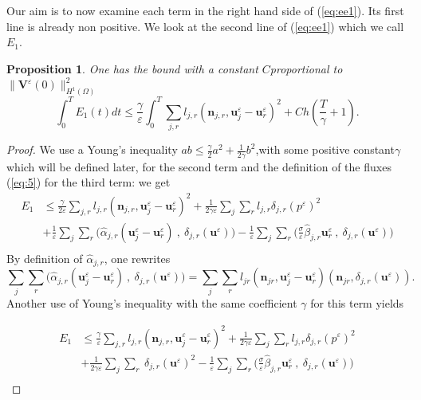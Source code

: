 \documentclass[a4paper,french,english,10pt]{article}
\newcommand\ljr{l_{jr}}
\newcommand\njr{\mathbf{n}_{jr}}
\newcommand\uu{\mathbf{u}}
\newcommand\eps{\varepsilon}
\newtheorem{pro}[theorem]{Proposition}
\begin{document}
Our aim is to now examine each term in the right hand side of
(\ref{eq:ee1}). Its  first line is already non positive.
We  look at the second line of (\ref{eq:ee1})  which we call
$E_1$. 
\begin{pro}
One has
the bound with a constant $C$proportional to $  \|  \mathbf V ^\eps (0) \|^2_  { H^1(\Omega)  }$  
\begin{equation} \label{eq:bound1}
\int_0^T E_1(t)dt \leq 
\frac{\gamma}{\eps}\int_0^T\sum_{j,r}l_{j,r}(\textbf{n}_{j,r},\textbf{u}_j^{\eps}-\textbf{u}
_r^{\eps})^2 
+Ch(  \frac T {\gamma } +1).
\end{equation}
\end{pro}
\begin{proof}
We use a Young's inequality 
$ab\leq \frac\gamma2 a^2+\frac1{2\gamma} b^2$,with some positive constant$\gamma$ which will be defined later,   for the second term
and the definition of the fluxes (\ref{eq:5}) for the third term: we get
\begin{equation*}
\begin{aligned}
E_1 &\leq  \frac{\gamma }{2 \eps}\sum_{j,r}l_{j,r}(\textbf{n}_{j,r},\textbf{u}_j^{\eps}
-\textbf{u}_r^{\eps})^2 + \frac{1}{2\gamma\eps} \sum_j \sum_r l_{j,r}
\delta_{j,r}(p^{\eps})^2 \\
&+\frac{1}{\eps} \sum_j \sum_r \bigg(
\widehat{\alpha}_{j,r}(\textbf{u}_j^{\eps}-\textbf{u}_r^{\eps}) \: , \:
\delta_{j,r}(\uu^{\eps}) \bigg) -\frac{1}{\eps} \sum_j \sum_r \bigg(
\frac{\sigma}{\eps} \widehat{\beta}_{j,r}\textbf{u}_r^{\eps}\: , \:
\delta_{j,r}(\uu^{\eps} )\bigg) \\
\end{aligned}
\end{equation*}
 By definition of $\widehat{\alpha}_{j,r}$,
one rewrites
 $$
\sum_j \sum_r \bigg(
\widehat{\alpha}_{j,r}(\textbf{u}_j^{\eps}-\textbf{u}_r^{\eps}) \: , \:
\delta_{j,r}(\uu^{\eps}) \bigg) = \sum_j \sum_r 
\ljr(\njr , \textbf{u}_j^{\eps}-\textbf{u}_r^{\eps} )(\njr ,
  \delta_{j,r}(\uu^{\eps})).
$$ 
Another use of Young's inequality with the same coefficient $\gamma$ for this term
yields


\begin{equation*}
\begin{aligned}
E_1 &\leq  \frac{\gamma }{ \eps}\sum_{j,r}l_{j,r}(\textbf{n}_{j,r},\textbf{u}_j^{\eps}
-\textbf{u}_r^{\eps})^2 + \frac{1}{2\gamma\eps} \sum_j \sum_r l_{j,r}
\delta_{j,r}(p^{\eps})^2 \\
&+\frac{1}{2\gamma\eps} \sum_j \sum_r 
\
\delta_{j,r}(\uu^{\eps})^2 -\frac{1}{\eps} \sum_j \sum_r \bigg(
\frac{\sigma}{\eps} \widehat{\beta}_{j,r}\textbf{u}_r^{\eps}\: , \:
\delta_{j,r}(\uu^{\eps} )\bigg) \\
\end{aligned}
\end{equation*}





\end{proof}
\end{document}
